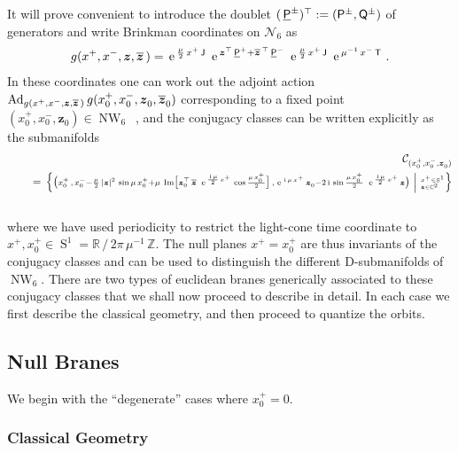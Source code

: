 \documentclass[11pt,a4paper]{article}
\DeclareMathOperator{\Sphere}{S}
\DeclareMathOperator{\NW}{NW}
\let\S\Sphere
\newcommand{\ii}{{\rm i}}
\newcommand{\mbf}[1]{{\boldsymbol {#1} }}
\def\ii{{\,{\rm i}\,}}
\def\P{{\sf P}}
\def\T{{\sf T}}
\def\Q{{\sf Q}}
\def\J{{\sf J}}
\def\mz{{\mbf z}}
\newcommand{\complex}{{\mathbb C}} %
\newcommand{\zed}{{\mathbb Z}} %
\newcommand{\real}{{\mathbb R}} %
\def\e{{\,\rm e}\,}
\def\bea{\begin{eqnarray}}
\def\eea{\end{eqnarray}}
\newcommand{\beq}{\begin{eqnarray}}
\newcommand{\eeq}{\end{eqnarray}}
\begin{document}
It will prove convenient to introduce the doublet
$(\,\underline{\P}^\pm)^\top:=(\P^\pm,\Q^\pm)$ of generators and write
Brinkman coordinates on $\mathcal{N}_6$ as
\beq
g(x^+,x^-,\mz,\overline{\mz}\,)=\e^{\frac\mu2\,x^+\,\J}~
\e^{\mz^\top\,\underline{\P}^++
\overline{\mz}{}^{\,\top}\,\underline{\P}^-}~\e^{\frac\mu2\,x^+\,\J}~
\e^{\mu^{-1}\,x^-\,\T} \ .
\label{NW6globalcoords}\eeq
In these coordinates one can work out the adjoint action ${\rm
Ad}_{g(x^+,x^-,\mz,\overline{\mz}\,)}\,g(x^+_0,x^-_0,\mz^{~}_0,
\overline{\mz}^{~}_0)$ corresponding to a fixed point
$(x_0^+,x_0^-,\mz^{~}_0)\in\NW_6$~\cite{FS1,SF1}, and the conjugacy
classes can be written explicitly as the submanifolds
\bea
&&\mathcal{C}_{(x_0^+,x^-_0,\mz^{~}_0)}\nonumber\\&&~~~~=~
\scriptstyle{\left.\Bigl\{\bigl(x^+_0\,,\,x^-_0-\frac\mu2
\,|\mz|^2\,\sin\mu\,x^+_0+\mu~{\rm Im}\bigl[
\mz_0^\top\,\overline{\mz}~\e^{\frac{\ii\mu}2\,x^+}\,
\cos\frac{\mu\,x_0^+}2\bigr]\,,\,\e^{\ii\mu\,x^+}\,\mz^{~}_0-2\ii
\sin\frac{\mu\,x_0^+}2~\e^{\frac{\ii\mu}2\,x^+}\,\mz
\bigr)~\right|~{}^{x^+\in\S^1}_{\mz\in\complex^2}\Bigr\}}\nonumber\\&&
\label{conjclassgen}\eea
where we have used periodicity to restrict the light-cone time coordinate to
$x^+,x^+_0\in\S^1=\real\,/\,2\pi\,\mu^{-1}\,\zed$. The null planes $x^+=x_0^+$
are thus invariants of the conjugacy classes and can be used
to distinguish the different D-submanifolds of $\NW_6$.
There are two types of euclidean branes generically associated to these
conjugacy classes that we shall now proceed to describe in detail. In
each case we first describe the classical geometry, and then proceed
to quantize the orbits.

\subsection{Null Branes\label{Null}}

We begin with the ``degenerate'' cases where $x_0^+=0$.

\subsubsection*{Classical Geometry}
\end{document}
